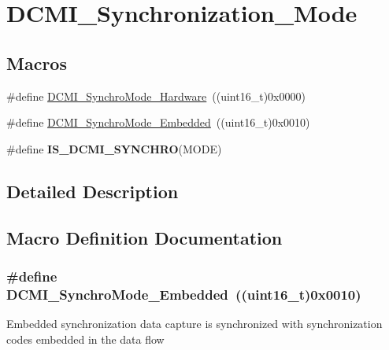 \hypertarget{group___d_c_m_i___synchronization___mode}{\section{D\-C\-M\-I\-\_\-\-Synchronization\-\_\-\-Mode}
\label{group___d_c_m_i___synchronization___mode}
}
\subsection*{Macros}
\begin{DoxyCompactItemize}
\item 
\#define \hyperlink{group___d_c_m_i___synchronization___mode_ga03d983bb911952d7f84783d5999a9559}{D\-C\-M\-I\-\_\-\-Synchro\-Mode\-\_\-\-Hardware}~((uint16\-\_\-t)0x0000)
\item 
\#define \hyperlink{group___d_c_m_i___synchronization___mode_ga66d71596091ae2a6273100ffa50334d0}{D\-C\-M\-I\-\_\-\-Synchro\-Mode\-\_\-\-Embedded}~((uint16\-\_\-t)0x0010)
\item 
\#define {\bfseries I\-S\-\_\-\-D\-C\-M\-I\-\_\-\-S\-Y\-N\-C\-H\-R\-O}(M\-O\-D\-E)
\end{DoxyCompactItemize}


\subsection{Detailed Description}


\subsection{Macro Definition Documentation}
\hypertarget{group___d_c_m_i___synchronization___mode_ga66d71596091ae2a6273100ffa50334d0}{
\subsubsection[{D\-C\-M\-I\-\_\-\-Synchro\-Mode\-\_\-\-Embedded}]{\setlength{\rightskip}{0pt plus 5cm}\#define D\-C\-M\-I\-\_\-\-Synchro\-Mode\-\_\-\-Embedded~((uint16\-\_\-t)0x0010)}}\label{group___d_c_m_i___synchronization___mode_ga66d71596091ae2a6273100ffa50334d0}
Embedded synchronization data capture is synchronized with synchronization codes embedded in the data flow 

